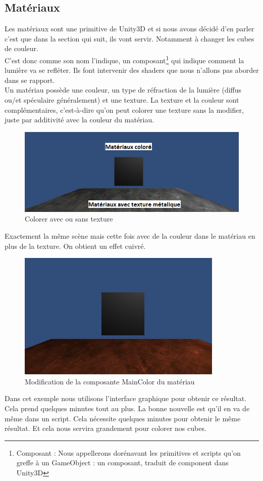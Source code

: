 \documentclass[a4paper,11pt]{myreport}
\begin{document}
	\subsection{Matériaux}
	\par Les matériaux sont une primitive de Unity3D et si nous avons décidé d'en parler c'est que dans la section qui suit, ils vont servir. Notamment à changer les cubes de couleur.\\
	C'est donc comme son nom l'indique, un composant\footnote{Composant : Nous appellerons dorénavant les primitives et scripts qu'on greffe à un GameObject : un composant, traduit de component dans Unity3D} qui indique comment la lumière va se refléter. Ils font intervenir des shaders que nous n'allons pas aborder dans se rapport.\\
	Un matériau possède une couleur, un type de réfraction de la lumière (diffus ou/et spéculaire généralement) et une texture. La texture et la couleur sont complémentaires, c'est-à-dire qu'on peut colorer une texture sans la modifier, juste par additivité avec la couleur du matériau.
	\begin{figure}[h]
	\includegraphics[scale=0.50]{./images/materiaux.png}
	\caption{Colorer avec ou sans texture}
	\end{figure}
	\par Exactement la même scène mais cette fois avec de la couleur dans le matériau en plus de la texture. On obtient un effet cuivré.
	\begin{figure}[h]
	\includegraphics[scale=0.40]{./images/materiaux_cuivre.png}
	\caption{Modification de la composante MainColor du matériau}
	\end{figure}
	\par Dans cet exemple nous utilisons l'interface graphique pour obtenir ce résultat. Cela prend quelques minutes tout au plus. La bonne nouvelle est qu'il en va de même dans un script. Cela nécessite quelques minutes pour obtenir le même résultat. Et cela nous servira grandement pour colorer nos cubes.
	\newpage
\end{document}
